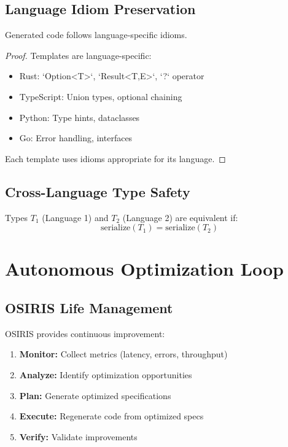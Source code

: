 \subsection{Language Idiom Preservation}

\begin{theorem}
    Generated code follows language-specific idioms.
\end{theorem}

\begin{proof}
    Templates are language-specific:
    \begin{itemize}
        \item Rust: `Option<T>`, `Result<T,E>`, `?` operator
        \item TypeScript: Union types, optional chaining
        \item Python: Type hints, dataclasses
        \item Go: Error handling, interfaces
    \end{itemize}
    Each template uses idioms appropriate for its language.
\end{proof}

\subsection{Cross-Language Type Safety}

\begin{definition}
    Types \(T_1\) (Language 1) and \(T_2\) (Language 2) are equivalent if:
    \begin{equation}
        \text{serialize}(T_1) = \text{serialize}(T_2)
    \end{equation}
\end{definition}

\section{Autonomous Optimization Loop}

\subsection{OSIRIS Life Management}

OSIRIS provides continuous improvement:

\begin{enumerate}
    \item \textbf{Monitor:} Collect metrics (latency, errors, throughput)
    \item \textbf{Analyze:} Identify optimization opportunities
    \item \textbf{Plan:} Generate optimized specifications
    \item \textbf{Execute:} Regenerate code from optimized specs
    \item \textbf{Verify:} Validate improvements
\end{enumerate}


